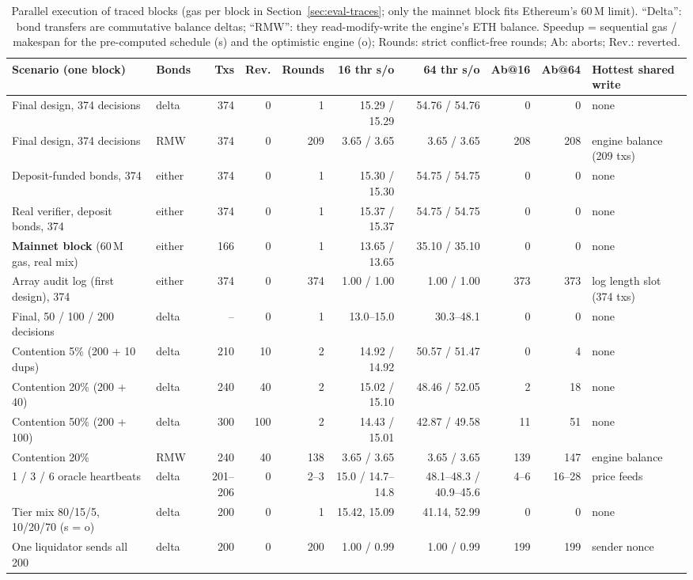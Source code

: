 \documentclass[sigconf,nonacm]{acmart}
\begin{document}
\begin{table}[t]
  \caption{Parallel execution of traced blocks (gas per block in Section~\ref{sec:eval-traces}; only the mainnet block fits Ethereum's 60\,M limit). ``Delta'': bond transfers are commutative balance deltas; ``RMW'': they read-modify-write the engine's ETH balance. Speedup = sequential gas / makespan for the pre-computed schedule (s) and the optimistic engine (o); Rounds: strict conflict-free rounds; Ab: aborts; Rev.: reverted.}
  \label{tab:parallel}
  \scriptsize
  \setlength{\tabcolsep}{2.6pt}
  \begin{tabular}{@{}llrrrrrrrl@{}}
    \toprule
    \textbf{Scenario (one block)} & \textbf{Bonds} & \textbf{Txs} & \textbf{Rev.} & \textbf{Rounds} & \textbf{16 thr s/o} & \textbf{64 thr s/o} & \textbf{Ab@16} & \textbf{Ab@64} & \textbf{Hottest shared write} \\
    \midrule
    Final design, 374 decisions & delta & 374 & 0 & 1 & 15.29 / 15.29 & 54.76 / 54.76 & 0 & 0 & none \\
    Final design, 374 decisions & RMW & 374 & 0 & 209 & 3.65 / 3.65 & 3.65 / 3.65 & 208 & 208 & engine balance (209 txs) \\
    Deposit-funded bonds, 374 & either & 374 & 0 & 1 & 15.30 / 15.30 & 54.75 / 54.75 & 0 & 0 & none \\
    Real verifier, deposit bonds, 374 & either & 374 & 0 & 1 & 15.37 / 15.37 & 54.75 / 54.75 & 0 & 0 & none \\
    \textbf{Mainnet block} (60\,M gas, real mix) & either & 166 & 0 & 1 & 13.65 / 13.65 & 35.10 / 35.10 & 0 & 0 & none \\
    Array audit log (first design), 374 & either & 374 & 0 & 374 & 1.00 / 1.00 & 1.00 / 1.00 & 373 & 373 & log length slot (374 txs) \\
    \midrule
    Final, 50 / 100 / 200 decisions & delta & -- & 0 & 1 & 13.0--15.0 & 30.3--48.1 & 0 & 0 & none \\
    Contention 5\% (200 + 10 dups) & delta & 210 & 10 & 2 & 14.92 / 14.92 & 50.57 / 51.47 & 0 & 4 & none \\
    Contention 20\% (200 + 40) & delta & 240 & 40 & 2 & 15.02 / 15.10 & 48.46 / 52.05 & 2 & 18 & none \\
    Contention 50\% (200 + 100) & delta & 300 & 100 & 2 & 14.43 / 15.01 & 42.87 / 49.58 & 11 & 51 & none \\
    Contention 20\% & RMW & 240 & 40 & 138 & 3.65 / 3.65 & 3.65 / 3.65 & 139 & 147 & engine balance \\
    1 / 3 / 6 oracle heartbeats & delta & 201--206 & 0 & 2--3 & 15.0 / 14.7--14.8 & 48.1--48.3 / 40.9--45.6 & 4--6 & 16--28 & price feeds \\
    Tier mix 80/15/5, 10/20/70 (s = o) & delta & 200 & 0 & 1 & 15.42, 15.09 & 41.14, 52.99 & 0 & 0 & none \\
    One liquidator sends all 200 & delta & 200 & 0 & 200 & 1.00 / 0.99 & 1.00 / 0.99 & 199 & 199 & sender nonce \\
    \bottomrule
  \end{tabular}
\end{table}
\end{document}
